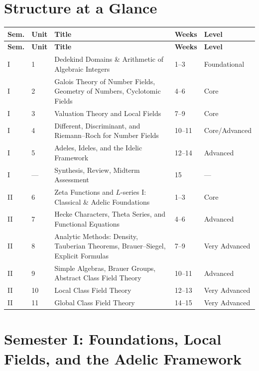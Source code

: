 \documentclass[11pt]{article}
\begin{document}
\section{Structure at a Glance}
\begin{longtable}{@{}C{1.1cm} C{1.0cm} L{7.4cm} C{1.6cm} L{2.3cm}@{}}
\toprule
\textbf{Sem.} & \textbf{Unit} & \textbf{Title} & \textbf{Weeks} & \textbf{Level} \\
\midrule
\endfirsthead
\toprule
\textbf{Sem.} & \textbf{Unit} & \textbf{Title} & \textbf{Weeks} & \textbf{Level} \\
\midrule
\endhead
I & 1 & Dedekind Domains \& Arithmetic of Algebraic Integers & 1--3 & Foundational \\
I & 2 & Galois Theory of Number Fields, Geometry of Numbers, Cyclotomic Fields & 4--6 & Core \\
I & 3 & Valuation Theory and Local Fields & 7--9 & Core \\
I & 4 & Different, Discriminant, and Riemann--Roch for Number Fields & 10--11 & Core/Advanced \\
I & 5 & Adeles, Ideles, and the Idelic Framework & 12--14 & Advanced \\
I & --- & Synthesis, Review, Midterm Assessment & 15 & --- \\
\addlinespace
II & 6 & Zeta Functions and $L$-series I: Classical \& Adelic Foundations & 1--3 & Core \\
II & 7 & Hecke Characters, Theta Series, and Functional Equations & 4--6 & Advanced \\
II & 8 & Analytic Methods: Density, Tauberian Theorems, Brauer--Siegel, Explicit Formulas & 7--9 & Very Advanced \\
II & 9 & Simple Algebras, Brauer Groups, Abstract Class Field Theory & 10--11 & Advanced \\
II & 10 & Local Class Field Theory & 12--13 & Very Advanced \\
II & 11 & Global Class Field Theory & 14--15 & Very Advanced \\
\bottomrule
\end{longtable}

\clearpage
\section{Semester I: Foundations, Local Fields, and the Adelic Framework}
\end{document}
